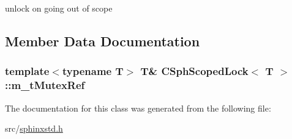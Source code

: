 unlock on going out of scope 



\subsection{Member Data Documentation}
\hypertarget{classCSphScopedLock_ab4f81a17e09f9ef2a3e520cf2c957806}{
\subsubsection[{m\-\_\-t\-Mutex\-Ref}]{\setlength{\rightskip}{0pt plus 5cm}template$<$typename T$>$ T\& {\bf C\-Sph\-Scoped\-Lock}$<$ T $>$\-::m\-\_\-t\-Mutex\-Ref\hspace{0.3cm}{\ttfamily [protected]}}}\label{classCSphScopedLock_ab4f81a17e09f9ef2a3e520cf2c957806}


The documentation for this class was generated from the following file\-:\begin{DoxyCompactItemize}
\item 
src/\hyperlink{sphinxstd_8h}{sphinxstd.\-h}\end{DoxyCompactItemize}
